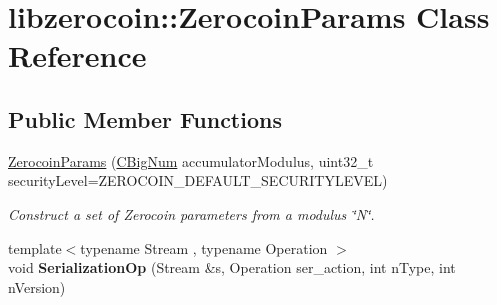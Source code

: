 \hypertarget{classlibzerocoin_1_1_zerocoin_params}{}\section{libzerocoin\+::Zerocoin\+Params Class Reference}
\label{classlibzerocoin_1_1_zerocoin_params}
\subsection*{Public Member Functions}
\begin{DoxyCompactItemize}
\item 
\mbox{\hyperlink{classlibzerocoin_1_1_zerocoin_params_ad7abfc8417e3f07feb7b786cb13c72b0}{Zerocoin\+Params}} (\mbox{\hyperlink{class_c_big_num}{C\+Big\+Num}} accumulator\+Modulus, uint32\+\_\+t security\+Level=Z\+E\+R\+O\+C\+O\+I\+N\+\_\+\+D\+E\+F\+A\+U\+L\+T\+\_\+\+S\+E\+C\+U\+R\+I\+T\+Y\+L\+E\+V\+EL)
\begin{DoxyCompactList}\small\item\em Construct a set of Zerocoin parameters from a modulus \char`\"{}\+N\char`\"{}. \end{DoxyCompactList}\item 
\mbox{\label{classlibzerocoin_1_1_zerocoin_params_ae1b316d1ff232c8f152118c6ae136428}} 
{\footnotesize template$<$typename Stream , typename Operation $>$ }\\void {\bfseries Serialization\+Op} (Stream \&s, Operation ser\+\_\+action, int n\+Type, int n\+Version)
\end{DoxyCompactItemize}
